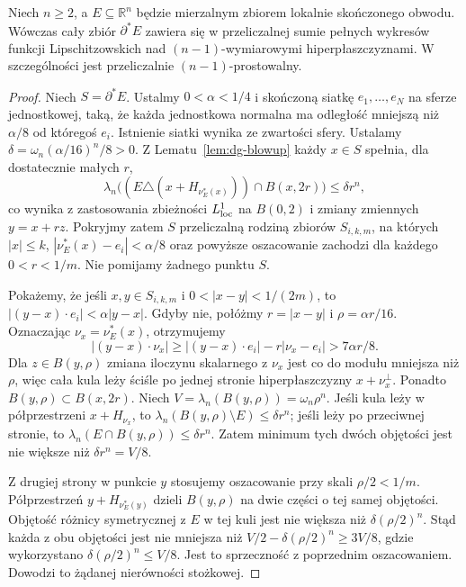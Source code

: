 \begin{lemat}
\label{lem:dg-rectifiability}
Niech $n\ge2$, a $E\subseteq\mathbb R^n$ będzie
mierzalnym zbiorem lokalnie skończonego obwodu.
Wówczas cały zbiór $\partial^*E$ zawiera się
w przeliczalnej sumie pełnych wykresów funkcji
Lipschitzowskich nad $(n-1)$-wymiarowymi
hiperpłaszczyznami. W szczególności jest
przeliczalnie $(n-1)$-prostowalny.
\end{lemat}
\begin{proof}
Niech $S=\partial^*E$. Ustalmy $0<\alpha<1/4$
i skończoną siatkę $e_1,\ldots,e_N$ na sferze
jednostkowej, taką, że każda jednostkowa normalna
ma odległość mniejszą niż $\alpha/8$ od któregoś
$e_i$. Istnienie siatki wynika ze zwartości sfery.
Ustalamy $\delta=\omega_n(\alpha/16)^n/8>0$.
Z Lematu~\ref{lem:dg-blowup} każdy $x\in S$
spełnia, dla dostatecznie małych $r$,
\[
 \lambda_n\bigl((E\triangle(x+H_{\nu_E^*(x)}))
 \cap B(x,2r)\bigr)\le\delta r^n,
\]
co wynika z zastosowania zbieżności
$L^1_{\rm loc}$ na $B(0,2)$ i zmiany zmiennych
$y=x+rz$. Pokryjmy zatem $S$ przeliczalną rodziną
zbiorów $S_{i,k,m}$, na których $|x|\le k$,
$|\nu_E^*(x)-e_i|<\alpha/8$ oraz powyższe
oszacowanie zachodzi dla każdego $0<r<1/m$.
Nie pomijamy żadnego punktu $S$.

Pokażemy, że jeśli $x,y\in S_{i,k,m}$ i
$0<|x-y|<1/(2m)$, to
$|(y-x)\cdot e_i|<\alpha|y-x|$.
Gdyby nie, połóżmy $r=|x-y|$ i
$\rho=\alpha r/16$. Oznaczając $\nu_x=\nu_E^*(x)$,
otrzymujemy
\[
 |(y-x)\cdot\nu_x|
 \ge |(y-x)\cdot e_i|-r|\nu_x-e_i|
 >7\alpha r/8.
\]
Dla $z\in B(y,\rho)$ zmiana iloczynu skalarnego
z $\nu_x$ jest co do modułu mniejsza niż $\rho$,
więc cała kula leży ściśle po jednej stronie
hiperpłaszczyzny $x+\nu_x^\perp$.
Ponadto $B(y,\rho)\subset B(x,2r)$.
Niech $V=\lambda_n(B(y,\rho))=\omega_n\rho^n$.
Jeśli kula leży w półprzestrzeni $x+H_{\nu_x}$,
to $\lambda_n(B(y,\rho)\setminus E)\le\delta r^n$;
jeśli leży po przeciwnej stronie, to
$\lambda_n(E\cap B(y,\rho))\le\delta r^n$.
Zatem minimum tych dwóch objętości jest
nie większe niż $\delta r^n=V/8$.

Z drugiej strony w punkcie $y$ stosujemy
oszacowanie przy skali $\rho/2<1/m$.
Półprzestrzeń $y+H_{\nu_E^*(y)}$ dzieli
$B(y,\rho)$ na dwie części o tej samej objętości.
Objętość różnicy symetrycznej z $E$ w tej kuli
jest nie większa niż $\delta(\rho/2)^n$.
Stąd każda z obu objętości jest nie mniejsza
niż $V/2-\delta(\rho/2)^n\ge3V/8$,
gdzie wykorzystano $\delta(\rho/2)^n\le V/8$.
Jest to sprzeczność z poprzednim oszacowaniem.
Dowodzi to żądanej nierówności stożkowej.


\end{proof}
